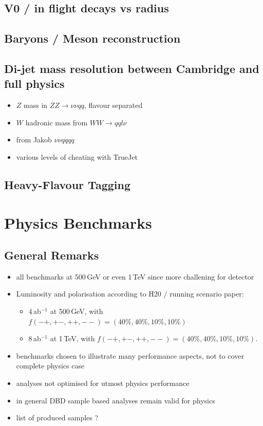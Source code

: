 \subsection{V0 / in flight decays vs radius}
\subsection{Baryons / Meson reconstruction}
\subsection{Di-jet mass resolution between Cambridge and full physics}
\begin{itemize}
\item $Z$ mass in $ZZ \to \nu\nu qq$, flavour separated
\item $W$ hadronic mass from $WW \to qq l\nu$
\item from Jakob $\nu\nu qqqq$
\item various levels of cheating with TrueJet
\end{itemize}

\subsection{Heavy-Flavour Tagging}

\section{Physics Benchmarks}
\subsection{General Remarks}
\begin{itemize}
\item all benchmarks at 500\,GeV or even 1\,TeV since more challening for detector
\item Luminosity and polarisation according to H20 / running scenario paper: 
  \begin{itemize}
   \item 4\,ab$^{-1}$ at 500\,GeV, with $f(-+,+-,++,--) = (40\%,40\%, 10\%, 10\%)$
   \item 8\,ab$^{-1}$ at 1\,TeV, with $f(-+,+-,++,--) = (40\%,40\%, 10\%, 10\%)$.
\end{itemize}
\item benchmarks chosen to illustrate many performance aspects, not to cover complete physics case
\item analyses not optimised for utmost physics performance
\item in general DBD sample based analyses remain valid for physics
\item list of produced samples ?
\end{itemize}

